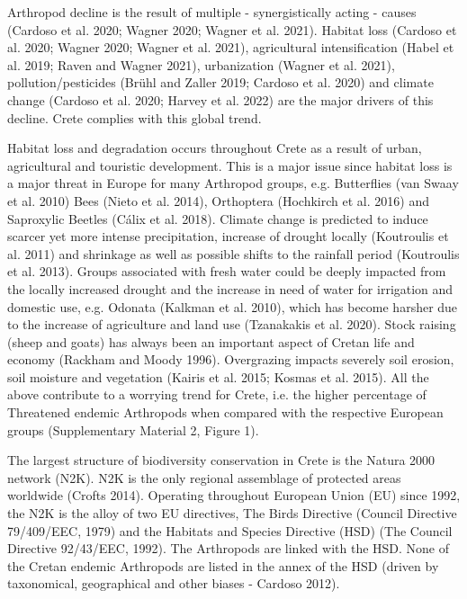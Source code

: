 Arthropod decline is the result of multiple - synergistically acting - causes (Cardoso et al. 2020; Wagner 2020; Wagner et al. 2021).
Habitat loss (Cardoso et al. 2020; Wagner 2020; Wagner et al. 2021),
agricultural intensification (Habel et al. 2019; Raven and Wagner 2021),
urbanization (Wagner et al. 2021), pollution/pesticides (Brühl and Zaller 2019; Cardoso et al. 2020)
and climate change (Cardoso et al. 2020; Harvey et al. 2022) are the major
drivers of this decline. Crete complies with this global trend.

Habitat loss and degradation occurs throughout Crete as a result of urban,
agricultural and touristic development. This is a major issue since habitat
loss is a major threat in Europe for many Arthropod groups,
e.g. Butterflies (van Swaay et al. 2010) Bees (Nieto et al. 2014),
Orthoptera (Hochkirch et al. 2016) and Saproxylic Beetles (Cálix et al. 2018).
Climate change is predicted to induce scarcer yet more intense precipitation,
increase of drought locally (Koutroulis et al. 2011) and shrinkage as well as
possible shifts to the rainfall period (Koutroulis et al. 2013). Groups
associated with fresh water could be deeply impacted from the locally increased
drought and the increase in need of water for irrigation and domestic use,
e.g. Odonata (Kalkman et al. 2010), which has become harsher due to the
increase of agriculture and land use (Tzanakakis et al. 2020). Stock raising
(sheep and goats) has always been an important aspect of Cretan life and
economy (Rackham and Moody 1996). Overgrazing impacts severely soil erosion,
soil moisture and vegetation (Kairis et al. 2015; Kosmas et al. 2015). All the
above contribute to a worrying trend for Crete, i.e. the higher percentage of
Threatened endemic Arthropods when compared with the respective European
groups (Supplementary Material 2, Figure 1).

The largest structure of biodiversity conservation in Crete is the Natura 2000
network (N2K). N2K is the only regional assemblage of protected areas
worldwide (Crofts 2014). Operating throughout European Union (EU) since 1992,
the N2K is the alloy of two EU directives, The Birds Directive (Council Directive 79/409/EEC, 1979)
and the Habitats and Species Directive (HSD) (The Council Directive 92/43/EEC, 1992).
The Arthropods are linked with the HSD. None of the Cretan endemic Arthropods
are listed in the annex of the HSD (driven by taxonomical, geographical and
other biases - Cardoso 2012).

